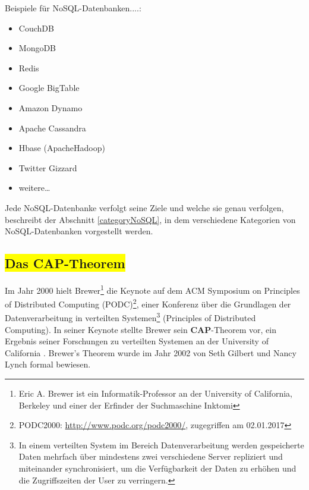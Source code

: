 Beispiele für NoSQL-Datenbanken....:
\begin{multicols}{2}
\begin{itemize}
\item CouchDB
\item MongoDB
\item Redis
\item Google BigTable
\item Amazon Dynamo
\item Apache Cassandra
\item Hbase (ApacheHadoop)
\item Twitter Gizzard
\item weitere…
\end{itemize}
\end{multicols}
Jede NoSQL-Datenbanke verfolgt seine Ziele und welche sie genau verfolgen, beschreibt der Abschnitt \ref{categoryNoSQL}, in dem verschiedene Kategorien von NoSQL-Datenbanken vorgestellt werden.

\subsection{\colorbox{yellow}{Das CAP-Theorem}}\label{cap}

Im Jahr 2000 hielt Brewer\footnote{Eric A. Brewer ist ein Informatik-Professor an der University of California, Berkeley und einer der Erfinder der Suchmaschine Inktomi} die Keynote auf dem ACM Symposium on Principles of Distributed Computing (PODC)\footnote{PODC2000: \url{http://www.podc.org/podc2000/}, zugegriffen am 02.01.2017}, einer Konferenz über die Grundlagen der Datenverarbeitung in verteilten Systemen\footnote{In einem verteilten System im Bereich Datenverarbeitung werden gespeicherte Daten mehrfach über mindestens zwei verschiedene Server repliziert und miteinander synchronisiert, um die Verfügbarkeit der Daten zu erhöhen und die Zugriffszeiten der User zu verringern.} (Principles of Distributed Computing).  In seiner Keynote stellte Brewer sein \textbf{CAP}-Theorem vor, ein Ergebnis seiner Forschungen zu verteilten Systemen an der University of California \cite[S. 13]{Kurowski.2012}. Brewer's Theorem wurde im Jahr 2002 von Seth Gilbert und Nancy Lynch formal bewiesen.

